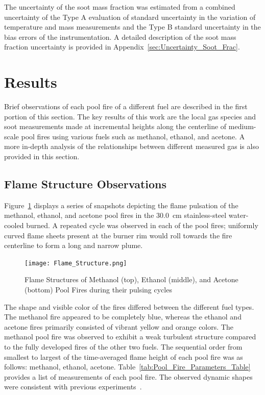 \documentclass[12pt]{article}
\begin{document}
The uncertainty of the soot mass fraction was estimated from a combined uncertainty of the Type A evaluation of standard uncertainty in the variation of temperature and mass measurements and the Type B standard uncertainty in the bias errors of the instrumentation. A detailed description of the soot mass fraction uncertainty is provided in Appendix~\ref{sec:Uncertainty_Soot_Frac}.

\section{Results}
\label{sec:Results}
Brief observations of each pool fire of a different fuel are described in the first portion of this section. The key results of this work are the local gas species and soot measurements made at incremental heights along the centerline of medium-scale pool fires using various fuels such as methanol, ethanol, and acetone. A more in-depth analysis of the relationships between different measured gas is also provided in this section.

\subsection{Flame Structure Observations}
\label{ssec:Flame_Structure}

Figure~\ref{fig:Flame_Structure} displays a series of snapshots depicting the flame pulsation of the methanol, ethanol, and acetone pool fires in the 30.0~\si{cm} stainless-steel water-cooled burned. A repeated cycle was observed in each of the pool fires; uniformly curved flame sheets present at the burner rim would roll towards the fire centerline to form a long and narrow plume.
\begin{figure}[!]
	\centering
\texttt{[image: Flame\_Structure.png]}
	\caption[Pool Fire Structures]{Flame Structures of Methanol (top), Ethanol (middle), and Acetone (bottom) Pool Fires during their pulsing cycles}
	\label{fig:Flame_Structure}
\end{figure}

The shape and visible color of the fires differed between the different fuel types. The methanol fire appeared to be completely blue, whereas the ethanol and acetone fires primarily consisted of vibrant yellow and orange colors. The methanol pool fire was observed to exhibit a weak turbulent structure compared to the fully developed fires of the other two fuels.  The sequential order from smallest to largest of the time-averaged flame height of each pool fire was as follows: methanol, ethanol, acetone. Table~\ref{tab:Pool_Fire_Parameters_Table} provides a list of measurements of each pool fire. The observed dynamic shapes were consistent with previous experiments~\cite{Hamins2016,Hamins1994,Hamins1991,Hamins1996,Lock2008}.
\end{document}
